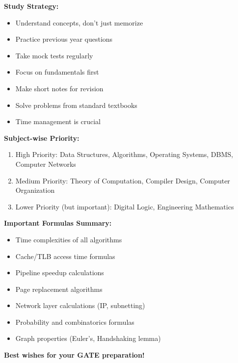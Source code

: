 \documentclass[11pt,a4paper]{article}
\begin{document}
\begin{notebox}
\textbf{Study Strategy:}
\begin{itemize}
    \item Understand concepts, don't just memorize
    \item Practice previous year questions
    \item Take mock tests regularly
    \item Focus on fundamentals first
    \item Make short notes for revision
    \item Solve problems from standard textbooks
    \item Time management is crucial
\end{itemize}
\end{notebox}

\begin{notebox}
\textbf{Subject-wise Priority:}
\begin{enumerate}
    \item High Priority: Data Structures, Algorithms, Operating Systems, DBMS, Computer Networks
    \item Medium Priority: Theory of Computation, Compiler Design, Computer Organization
    \item Lower Priority (but important): Digital Logic, Engineering Mathematics
\end{enumerate}
\end{notebox}

\begin{notebox}
\textbf{Important Formulas Summary:}
\begin{itemize}
    \item Time complexities of all algorithms
    \item Cache/TLB access time formulas
    \item Pipeline speedup calculations
    \item Page replacement algorithms
    \item Network layer calculations (IP, subnetting)
    \item Probability and combinatorics formulas
    \item Graph properties (Euler's, Handshaking lemma)
\end{itemize}
\end{notebox}

\textbf{Best wishes for your GATE preparation!}
\end{document}
